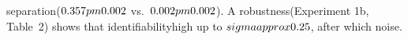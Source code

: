 \documentclass[11pt]{article}
\begin{document}
separation\n($0.357\\pm 0.002$ vs.~$0.002\\pm 0.002$). A robustness\nsweep (Experiment 1b, Table~2) shows that identifiability\nremains high up to $\\sigma \\approx 0.25$, after which noise\ndominates.\n\n%
\end{document}
